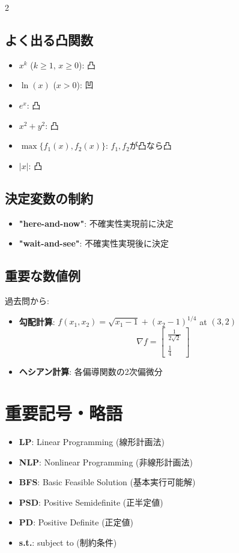 \documentclass[10pt,a4paper,landscape]{article}
\begin{document}
\begin{multicols}{2}
\subsection*{よく出る凸関数}
\begin{itemize}
\item $x^k$ ($k \geq 1$, $x \geq 0$): 凸
\item $\ln(x)$ ($x > 0$): 凹
\item $e^x$: 凸
\item $x^2 + y^2$: 凸
\item $\max\{f_1(x), f_2(x)\}$: $f_1, f_2$が凸なら凸
\item $|x|$: 凸
\end{itemize}

\subsection*{決定変数の制約}
\begin{itemize}
\item \textbf{"here-and-now"}: 不確実性実現前に決定
\item \textbf{"wait-and-see"}: 不確実性実現後に決定
\end{itemize}

\subsection*{重要な数値例}
過去問から:
\begin{itemize}
\item \textbf{勾配計算}: $f(x_1,x_2) = \sqrt{x_1-1} + (x_2-1)^{1/4}$ at $(3,2)$
  \[\nabla f = \begin{bmatrix} \frac{1}{2\sqrt{2}} \\ \frac{1}{4} \end{bmatrix}\]
\item \textbf{ヘシアン計算}: 各偏導関数の2次偏微分
\end{itemize}

\end{multicols}

\vfill

\section*{重要記号・略語}
\begin{itemize}
\item \textbf{LP}: Linear Programming (線形計画法)
\item \textbf{NLP}: Nonlinear Programming (非線形計画法)  
\item \textbf{BFS}: Basic Feasible Solution (基本実行可能解)
\item \textbf{PSD}: Positive Semidefinite (正半定値)
\item \textbf{PD}: Positive Definite (正定値)
\item \textbf{s.t.}: subject to (制約条件)
\end{itemize}
\end{document}
